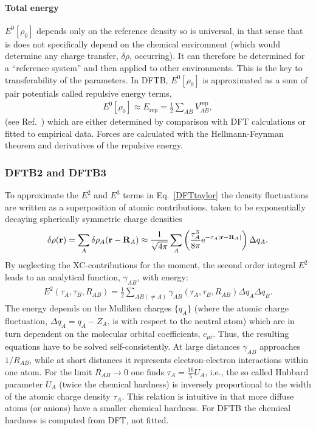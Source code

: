 \documentclass{revtex4-1}
\begin{document}
\paragraph{Total energy}
$E^0[\rho_0]$ depends only on the reference density so is universal, in that
sense that is does not specifically depend on the chemical environment (which
would determine any charge transfer, $\delta \rho$, occurring). It can
therefore be determined for a ``reference system'' and then applied to other
environments. This is the key to transferability of the parameters. In DFTB,
$E^0[\rho_0]$ is approximated as a sum of pair potentials called repulsive
energy terms,
\begin{eqnarray}
  E^0[\rho_0] \approx E_\text{rep} = \frac{1}{2}\sum_{AB}V^{\text{rep}}_{AB},
  \label{eq:erep}
\end{eqnarray}
(see Ref.~) which are either determined by comparison
with DFT calculations\cite{Porezag1995} or fitted to empirical
data.\cite{Gaus2009} Forces are calculated with the Hellmann-Feynman theorem and
derivatives of the repulsive energy.


\subsubsection{DFTB2 and DFTB3}
\label{sec:dftb2}
To approximate the $E^2$ and $E^3$ terms in Eq.~\eqref{DFTtaylor} the density
fluctuations are written as a superposition of atomic contributions,
taken to be exponentially decaying spherically symmetric charge densities
\begin{eqnarray}
  \delta\rho(\mathbf{r}) = \sum_A \delta \rho_A(\mathbf{r} - \mathbf{R}_A)
  \approx \frac{1}{\sqrt{4\pi}} \sum_A \left( \frac{\tau_A^3}{8\pi}
  \mathrm{e}^{-\tau_A|\mathbf{r}-\mathbf{R}_A|} \right) \Delta q_A \text.
\end{eqnarray}
By neglecting the XC-contributions for the moment, the second order integral
$E^2$ leads to an analytical function, $\gamma_{AB}$, with
energy:\cite{Elstner1998}
%
\begin{eqnarray}
  E^2(\tau_A,\tau_B,R_{AB}) = \frac{1}{2}\sum_{AB(\ne A)}
  \gamma_{AB}(\tau_A,\tau_B,R_{AB}) \Delta q_A \Delta q_B.\label{spin2}
\end{eqnarray}
%
The energy depends on the Mulliken charges $\{q_A\}$ (where the atomic charge
fluctuation, $\Delta q_A = q_A - Z_A$, is with respect to the neutral atom)
which are in turn dependent on the molecular orbital coefficients, $c_{\mu
  i}$. Thus, the resulting equations have to be solved self-consistently. At
large distances $\gamma_{AB}$ approaches $1/R_{AB}$, while at short distances it
represents electron-electron interactions within one atom.  For the limit
$R_{AB}\rightarrow 0$ one finds $\tau_A = \frac{16}{5} U_A$, i.e., the so called
Hubbard parameter $U_A$ (twice the chemical hardness) is inversely proportional
to the width of the atomic charge density $\tau_A$. This relation is intuitive
in that more diffuse atoms (or anions) have a smaller chemical hardness. For
DFTB the chemical hardness is computed from DFT, not fitted.
\end{document}
